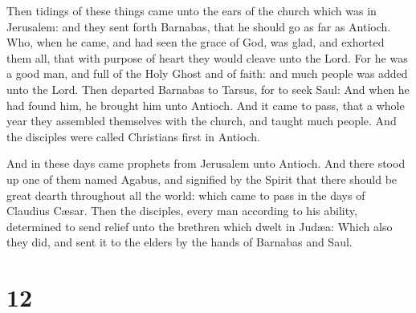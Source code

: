 Then tidings of these things came unto the ears of the
church which was in Jerusalem: and they sent forth Barnabas, that he
should go as far as Antioch.  Who, when he came, and had
seen the grace of God, was glad, and exhorted them all, that with
purpose of heart they would cleave unto the Lord.  For he
was a good man, and full of the Holy Ghost and of faith: and much people
was added unto the Lord.  Then departed Barnabas to Tarsus,
for to seek Saul:  And when he had found him, he brought
him unto Antioch. And it came to pass, that a whole year they assembled
themselves with the church, and taught much people. And the disciples
were called Christians first in Antioch.

 And in these days came prophets from Jerusalem unto
Antioch.  And there stood up one of them named Agabus, and
signified by the Spirit that there should be great dearth throughout all
the world: which came to pass in the days of Claudius Cæsar.
 Then the disciples, every man according to his ability,
determined to send relief unto the brethren which dwelt in Judæa:
 Which also they did, and sent it to the elders by the
hands of Barnabas and Saul.

\hypertarget{section-11}{%
\section{12}\label{section-11}}

